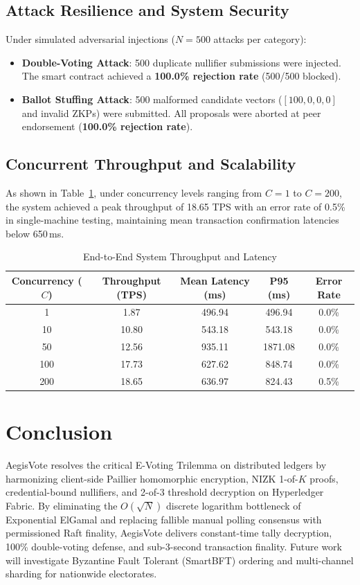 \documentclass[journal,10pt,twocolumn]{IEEEtran}
\begin{document}
\subsection{Attack Resilience and System Security}
Under simulated adversarial injections ($N=500$ attacks per category):
\begin{itemize}
    \item \textbf{Double-Voting Attack}: 500 duplicate nullifier submissions were injected. The smart contract achieved a \textbf{100.0\% rejection rate} (500/500 blocked).
    \item \textbf{Ballot Stuffing Attack}: 500 malformed candidate vectors ($[100, 0, 0, 0]$ and invalid ZKPs) were submitted. All proposals were aborted at peer endorsement (\textbf{100.0\% rejection rate}).
\end{itemize}

\subsection{Concurrent Throughput and Scalability}
As shown in Table~\ref{tab:throughput}, under concurrency levels ranging from $C=1$ to $C=200$, the system achieved a peak throughput of 18.65 TPS with an error rate of 0.5\% in single-machine testing, maintaining mean transaction confirmation latencies below 650\,ms.

\begin{table}[h]
\centering
\caption{End-to-End System Throughput and Latency}
\label{tab:throughput}
\begin{tabular}{ccccc}
\toprule
\textbf{Concurrency ($C$)} & \textbf{Throughput (TPS)} & \textbf{Mean Latency (ms)} & \textbf{P95 (ms)} & \textbf{Error Rate} \\
\midrule
1   & 1.87  & 496.94 & 496.94 & 0.0\% \\
10  & 10.80 & 543.18 & 543.18 & 0.0\% \\
50  & 12.56 & 935.11 & 1871.08 & 0.0\% \\
100 & 17.73 & 627.62 & 848.74 & 0.0\% \\
200 & 18.65 & 636.97 & 824.43 & 0.5\% \\
\bottomrule
\end{tabular}
\end{table}

\section{Conclusion}
AegisVote resolves the critical E-Voting Trilemma on distributed ledgers by harmonizing client-side Paillier homomorphic encryption, NIZK 1-of-$K$ proofs, credential-bound nullifiers, and 2-of-3 threshold decryption on Hyperledger Fabric. By eliminating the $O(\sqrt{N})$ discrete logarithm bottleneck of Exponential ElGamal and replacing fallible manual polling consensus with permissioned Raft finality, AegisVote delivers constant-time tally decryption, 100\% double-voting defense, and sub-3-second transaction finality. Future work will investigate Byzantine Fault Tolerant (SmartBFT) ordering and multi-channel sharding for nationwide electorates.



\end{document}
